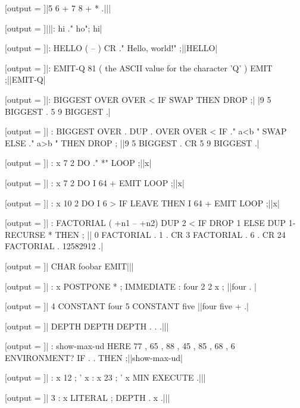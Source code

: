 \RequirePackage{runner}
\newcommand{\result}{}

[output = \result]|5 6 + 7 8 + * .|||
\typeout{\result}

[output = \result]|||: hi ." ho"; hi|
\typeout{\result}

[output = \result]|: HELLO  ( -- )  CR ." Hello, world!" ;||HELLO|
\typeout{\result}

[output = \result]|: EMIT-Q   81 ( the ASCII value for the character 'Q' ) EMIT ;||EMIT-Q|
\typeout{\result}

[output = \result]|: BIGGEST OVER OVER < IF SWAP THEN DROP ;|%
|9 5 BIGGEST . 5 9 BIGGEST .|
\typeout{\result}

[output = \result]|
  : BIGGEST OVER . DUP .
    OVER OVER < IF
      ." a<b " SWAP
    ELSE
      ." a>b "
    THEN
    DROP ;
||9 5 BIGGEST . CR 5 9 BIGGEST .|
\typeout{\result}

[output = \result]|
  : x 7 2 DO ." *" LOOP ;||x|
\typeout{\result}

[output = \result]|
  : x 7 2 DO I 64 + EMIT LOOP ;||x|
\typeout{\result}

[output = \result]|
  : x 10 2 DO I 6 > IF LEAVE THEN I 64 + EMIT LOOP ;||x|
\typeout{\result}

[output = \result]|
  : FACTORIAL ( +n1 -- +n2)
  DUP 2 < IF DROP 1 ELSE
  DUP 1- RECURSE * THEN
  ;
||
0 FACTORIAL . 1 . CR
3 FACTORIAL . 6 . CR
24 FACTORIAL . 12582912 .|
\typeout{\result}

[output = \result]|
  CHAR foobar EMIT|||
\typeout{\result}

[output = \result]|
  : x POSTPONE * ; IMMEDIATE :
  four 2 2 x ;
||four . |
\typeout{\result}

[output = \result]|
  4 CONSTANT four
  5 CONSTANT five
||four five + .|
\typeout{\result}

[output = \result]|
  DEPTH DEPTH DEPTH . . .|||
\typeout{\result}

[output = \result]|
  : show-max-ud HERE 77 , 65 , 88 , 45 , 85 , 68 ,
    6 ENVIRONMENT? IF . . THEN ;||show-max-ud|
\typeout{\result}

[output = \result]|
  : x 12 ; ' x
  : x 23 ; ' x
  MIN EXECUTE .|||
\typeout{\result}

[output = \result]|
  3 : x LITERAL ; DEPTH . x .|||
\typeout{\result}


